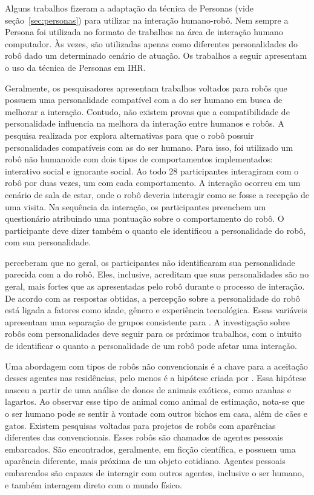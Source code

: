 Alguns trabalhos fizeram a adaptação da técnica de Personas (vide seção~\ref{sec:personas}) para utilizar na interação humano-robô. Nem sempre a Persona foi utilizada no formato de trabalhos na área de interação humano computador. Às vezes, são utilizadas apenas como diferentes personalidades do robô dado um determinado cenário de atuação. Os trabalhos a seguir apresentam o uso da técnica de Personas em IHR.

Geralmente, os pesquisadores apresentam trabalhos voltados para robôs que possuem uma personalidade compatível com a do ser humano em busca de melhorar a interação. Contudo, não existem provas que a compatibilidade de personalidade influencia na melhora da interação entre humanos e robôs. A pesquisa realizada por \textcite{woods:2005} explora alternativas para que o robô possuir personalidades compatíveis com as do ser humano. Para isso, foi utilizado um robô não humanoide com dois tipos de comportamentos implementados: interativo social e ignorante social. Ao todo 28 participantes interagiram com o robô por duas vezes, um com cada comportamento. A interação ocorreu em um cenário de sala de estar, onde o robô deveria interagir como se fosse a recepção de uma visita. Na sequência da interação, os participantes preenchem um questionário atribuindo uma pontuação sobre o comportamento do robô. O participante deve dizer também o quanto ele identificou a personalidade do robô, com sua personalidade.

\textcite{woods:2005} perceberam que no geral, os participantes não identificaram sua personalidade parecida com a do robô. Eles, inclusive, acreditam que suas personalidades são no geral, mais fortes que as apresentadas pelo robô durante o processo de interação. De acordo com as respostas obtidas, a percepção sobre a personalidade do robô está ligada a fatores como idade, gênero e experiência tecnológica. Essas variáveis apresentam uma separação de grupos consistente para \textcite{woods:2005}. A investigação sobre robôs com personalidades deve seguir para os próximos trabalhos, com o intuito de identificar o quanto a personalidade de um robô pode afetar uma interação.

Uma abordagem com tipos de robôs não convencionais é a chave para a aceitação desses agentes nas residências, pelo menos é a hipótese criada por \textcite{ljungblad:2006}. Essa hipótese nasceu a partir de uma análise de donos de animais exóticos, como aranhas e lagartos. Ao observar esse tipo de animal como animal de estimação, nota-se que o ser humano pode se sentir à vontade com outros bichos em casa, além de cães e gatos. Existem pesquisas voltadas para projetos de robôs com aparências diferentes das convencionais. Esses robôs são chamados de agentes pessoais embarcados. São encontrados, geralmente, em ficção científica, e possuem uma aparência diferente, mais próxima de um objeto cotidiano. Agentes pessoais embarcados são capazes de interagir com outros agentes, inclusive o ser humano, e também interagem direto com o mundo físico.

